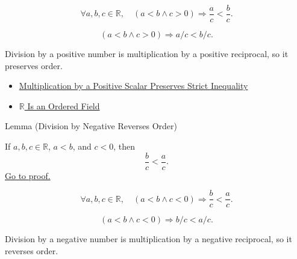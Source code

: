 \begin{remark*}
\[
\forall a,b,c\in\mathbb{R},\quad (a<b\land c>0)\Rightarrow \frac ac<\frac bc.
\]
\end{remark*}

\begin{remark*}
\[
(a<b\land c>0)\Rightarrow a/c<b/c.
\]
\end{remark*}

\begin{remark*}[Interpretation]
Division by a positive number is multiplication by a positive reciprocal, so it preserves order.
\end{remark*}

\begin{dependencies}
\begin{itemize}
  \item \hyperref[thm:ineq-multiply-positive]{Multiplication by a Positive Scalar Preserves Strict Inequality}
  \item \hyperref[thm:r-is-an-ordered-field]{$\mathbb{R}$ Is an Ordered Field}
\end{itemize}
\end{dependencies}

\begin{lemmabox}{Lemma (Division by Negative Reverses Order)}
\begin{lemma}\label{lem:division-by-negative-reverses-order}
If $a,b,c\in\mathbb{R}$, $a<b$, and $c<0$, then
\[
\frac bc<\frac ac.
\]
\hyperref[prf:division-by-negative-reverses-order]{Go to proof.}
\end{lemma}
\end{lemmabox}

\begin{remark*}
\[
\forall a,b,c\in\mathbb{R},\quad (a<b\land c<0)\Rightarrow \frac bc<\frac ac.
\]
\end{remark*}

\begin{remark*}
\[
(a<b\land c<0)\Rightarrow b/c<a/c.
\]
\end{remark*}

\begin{remark*}[Interpretation]
Division by a negative number is multiplication by a negative reciprocal, so it reverses order.
\end{remark*}


